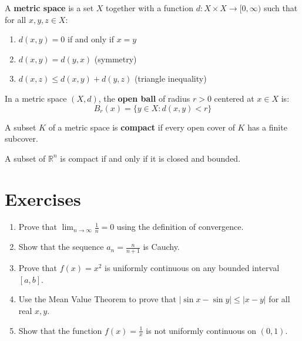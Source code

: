 \begin{definition}
A \textbf{metric space} is a set $X$ together with a function $d: X \times X \to [0, \infty)$ such that for all $x, y, z \in X$:
\begin{enumerate}
    \item $d(x, y) = 0$ if and only if $x = y$
    \item $d(x, y) = d(y, x)$ (symmetry)
    \item $d(x, z) \leq d(x, y) + d(y, z)$ (triangle inequality)
\end{enumerate}
\end{definition}

\begin{definition}
In a metric space $(X, d)$, the \textbf{open ball} of radius $r > 0$ centered at $x \in X$ is:
\[B_r(x) = \{y \in X : d(x, y) < r\}\]
\end{definition}

\begin{definition}
A subset $K$ of a metric space is \textbf{compact} if every open cover of $K$ has a finite subcover.
\end{definition}

\begin{theorem}
A subset of $\mathbb{R}^n$ is compact if and only if it is closed and bounded.
\end{theorem}

\section{Exercises}

\begin{enumerate}
    \item Prove that $\lim_{n \to \infty} \frac{1}{n} = 0$ using the definition of convergence.
    
    \item Show that the sequence $a_n = \frac{n}{n+1}$ is Cauchy.
    
    \item Prove that $f(x) = x^2$ is uniformly continuous on any bounded interval $[a,b]$.
    
    \item Use the Mean Value Theorem to prove that $|\sin x - \sin y| \leq |x - y|$ for all real $x, y$.
    
    \item Show that the function $f(x) = \frac{1}{x}$ is not uniformly continuous on $(0,1)$.
\end{enumerate}
